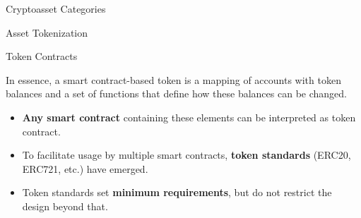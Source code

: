 \documentclass[handout]{beamer}
\begin{document}
\begin{frame}{Cryptoasset Categories}
\end{frame}

\begin{frame}{Asset Tokenization}
	\begin{figure} [h]
 		\center
			
 	\end{figure}
\end{frame}

\begin{frame}{Token Contracts}

\begin{minipage}{0.35\textwidth}
	\begin{tikzpicture}[scale=1.0, every node/.style={scale=1.0}]
			
	\end{tikzpicture}
\end{minipage}
\begin{minipage}{0.6\textwidth}
			In essence, a smart contract-based token is \color{focus}a mapping \color{black}of accounts with token balances and a \color{focus} set of functions \color{black} that define how these balances can be changed.  
\end{minipage}

\vspace{2 em}

\begin{itemize}
	\item<2-> \textbf{Any smart contract} containing these elements can be interpreted as token contract.
	\item<3-> To facilitate usage by multiple smart contracts, \textbf{token standards} (ERC20, ERC721, etc.) have emerged.
	\item<4-> Token standards set \textbf{minimum requirements}, but do not restrict the design beyond that. 
\end{itemize}	
	

\end{frame}
\end{document}

